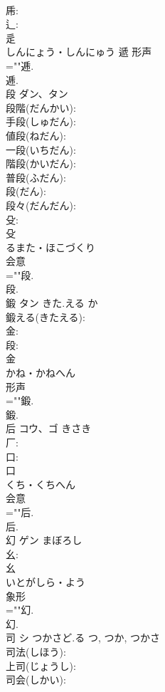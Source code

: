 \documentclass[8pt]{extreport}
\begin{document}
\begin{CJK}{UTF8}{min}
\\	乕: 
\\	辶: 
\\	辵	
\\	しんにょう・しんにゅう	遞	形声 
\\	=""逓.
\\	逓.
\\	段	ダン、タン			
\\	段階(だんかい): 
\\	手段(しゅだん): 
\\	値段(ねだん): 
\\	一段(いちだん): 
\\	階段(かいだん): 
\\	普段(ふだん): 
\\	段(だん): 
\\	段々(だんだん): 
\\	殳: 
\\	殳	
\\	るまた・ほこづくり	
\\	会意 
\\	=""段.
\\	段.
\\	鍛	タン	きた.える	か	
\\	鍛える(きたえる): 
\\	金: 
\\	段: 
\\	金	
\\	かね・かねへん	
\\	形声 
\\	=""鍛.
\\	鍛.
\\	后	コウ、ゴ	きさき		
\\	厂: 
\\	口: 
\\	口	
\\	くち・くちへん	
\\	会意 
\\	=""后.
\\	后.
\\	幻	ゲン	まぼろし		
\\	幺: 
\\	幺	
\\	いとがしら・よう	
\\	象形 
\\	=""幻.
\\	幻.
\\	司	シ	つかさど.る	つ, つか, つかさ	
\\	司法(しほう): 
\\	上司(じょうし): 
\\	司会(しかい): 

\end{CJK}
\end{document}
